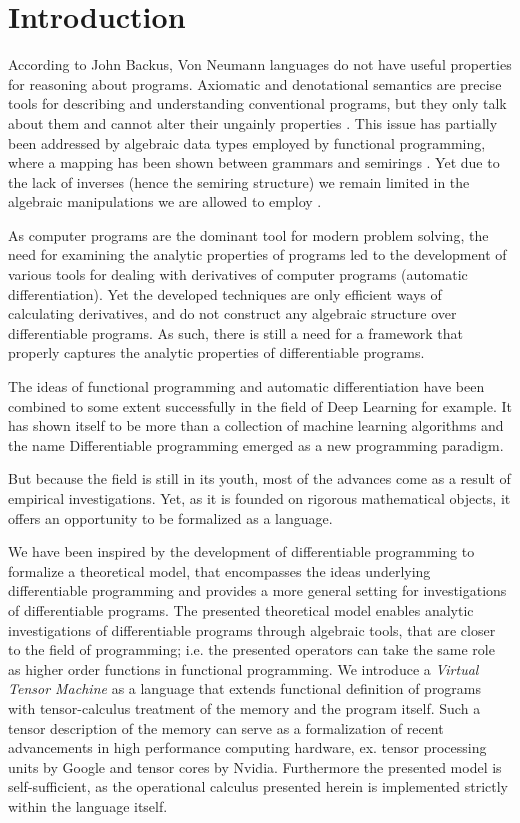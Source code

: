 \section{Introduction}

According to John Backus, Von Neumann languages do not have useful properties for reasoning about programs. Axiomatic and denotational semantics are precise tools for describing and understanding conventional programs, but they only talk about them and cannot alter their ungainly
properties \cite{backus}. This issue has partially been addressed by algebraic data types employed by functional programming, where a mapping has been shown between grammars and semirings \cite{7Trees}.
Yet due to the lack of inverses (hence the semiring structure) we remain limited in the algebraic manipulations we are allowed to employ \cite{complexCat}.

As computer programs are the dominant tool for modern problem solving, the need for examining the analytic properties of programs led to the development of various tools for dealing with derivatives of computer programs (automatic differentiation). Yet the developed techniques are only efficient ways of calculating derivatives, and do not construct any algebraic structure over differentiable programs. As such, there is still a need for a framework that properly captures the analytic properties of differentiable programs. 

The ideas of functional programming and automatic differentiation have been combined to some extent successfully in the field of Deep Learning for example. %
It has shown itself to be more than a collection of machine learning algorithms and the name Differentiable programming emerged as a new programming paradigm. 



But because the field is still in its youth, most of the advances come as a result of empirical investigations.%
Yet, as it is founded on rigorous mathematical objects, it offers an opportunity to be formalized as a language.

We have been inspired by the development of differentiable programming to formalize a theoretical model, that encompasses the ideas underlying differentiable programming and provides a more general setting for investigations of differentiable programs. The presented theoretical model enables analytic investigations of differentiable programs through algebraic tools, that are closer to the field of programming; i.e. the presented operators can take the same role as higher order functions in functional programming. We introduce a \emph{Virtual Tensor Machine} as a language that extends functional definition of programs with tensor-calculus treatment of the memory and the program itself. Such a tensor description of the memory can serve as a formalization of recent advancements in high performance computing hardware, ex. tensor processing units by Google and tensor cores by Nvidia. Furthermore the presented model is self-sufficient, as the operational calculus presented herein is implemented strictly within the language itself.


